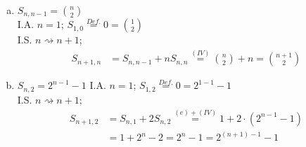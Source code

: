 \documentclass[11pt,a4paper,ngerman]{article}
\begin{document}
\begin{enumerate}[a)]
\item $S_{n,n-1} = \binom{n}{2}$ \\
I.A. $n=1$; $S_{1,0} \stackrel{Def.}{=} 0 = \binom{1}{2} $ \\
I.S. $n \rightsquigarrow n+1$;
  \begin{equation*}\begin{split}
    S_{n+1,n} &= S_{n,n-1} + n S_{n,n} \stackrel{(IV)}{=} \binom{n}{2} + n = \binom{n+1}{2}
  \end{split}\end{equation*}
\item $S_{n,2} = 2^{n-1} -1 $
I.A. $n=1$; $S_{1,2} \stackrel{Def.}{=} 0 = 2^{1-1} - 1 $ \\
I.S. $n \rightsquigarrow n+1$;
  \begin{equation*}\begin{split}
    S_{n+1,2} &= S_{n,1} + 2 S_{n,2} \stackrel{(e)+(IV)}{=} 1 + 2\cdot (2^{n-1} -1) \\
              &= 1+ 2^n - 2 = 2^n - 1 = 2^{(n+1)-1} - 1
  \end{split}\end{equation*}

\end{enumerate}

\label{LastPage}
\end{document}
